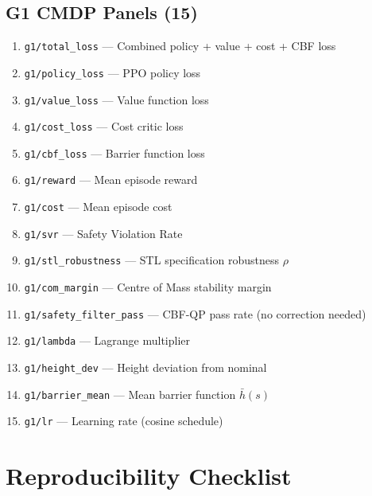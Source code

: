 \documentclass[conference]{IEEEtran}
\begin{document}
\subsection{G1 CMDP Panels (15)}
\begin{enumerate}
    \item \texttt{g1/total\_loss} — Combined policy + value + cost + CBF loss
    \item \texttt{g1/policy\_loss} — PPO policy loss
    \item \texttt{g1/value\_loss} — Value function loss
    \item \texttt{g1/cost\_loss} — Cost critic loss
    \item \texttt{g1/cbf\_loss} — Barrier function loss
    \item \texttt{g1/reward} — Mean episode reward
    \item \texttt{g1/cost} — Mean episode cost
    \item \texttt{g1/svr} — Safety Violation Rate
    \item \texttt{g1/stl\_robustness} — STL specification robustness $\rho$
    \item \texttt{g1/com\_margin} — Centre of Mass stability margin
    \item \texttt{g1/safety\_filter\_pass} — CBF-QP pass rate (no correction needed)
    \item \texttt{g1/lambda} — Lagrange multiplier
    \item \texttt{g1/height\_dev} — Height deviation from nominal
    \item \texttt{g1/barrier\_mean} — Mean barrier function $\bar{h}(s)$
    \item \texttt{g1/lr} — Learning rate (cosine schedule)
\end{enumerate}

\section{Reproducibility Checklist}
\label{sec:supp_repro}
\end{document}
